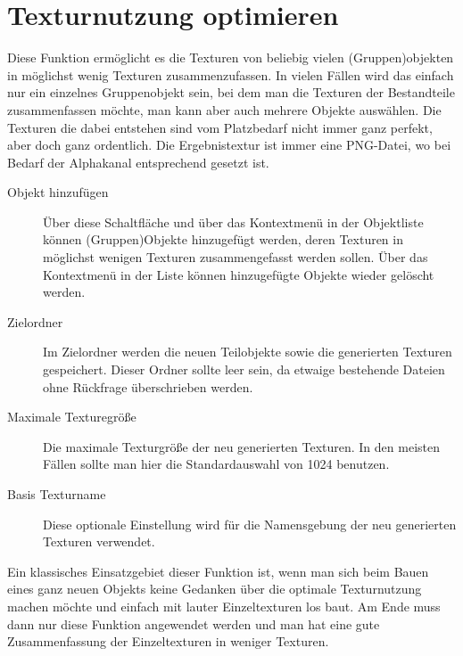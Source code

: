 
\section{Texturnutzung optimieren}
\label{sec:editor-texturnutzung-optimieren}
Diese Funktion ermöglicht es die Texturen von beliebig vielen (Gruppen)objekten in möglichst wenig Texturen zusammenzufassen. In vielen Fällen wird das einfach nur ein einzelnes Gruppenobjekt sein, bei dem man die Texturen der Bestandteile zusammenfassen möchte, man kann aber auch mehrere Objekte auswählen. Die Texturen die dabei entstehen sind vom Platzbedarf nicht immer ganz perfekt, aber doch ganz ordentlich. Die Ergebnistextur ist immer eine PNG-Datei, wo bei Bedarf der Alphakanal entsprechend gesetzt ist.

\begin{description}
\item[Objekt hinzufügen] Über diese Schaltfläche und über das Kontextmenü in der Objektliste können (Gruppen)Objekte hinzugefügt werden, deren Texturen in möglichst wenigen Texturen zusammengefasst werden sollen. Über das Kontextmenü in der Liste können hinzugefügte Objekte wieder gelöscht werden.
\item[Zielordner] Im Zielordner werden die neuen Teilobjekte sowie die generierten Texturen gespeichert. Dieser Ordner sollte leer sein, da etwaige bestehende Dateien ohne Rückfrage überschrieben werden.
\item[Maximale Texturegröße] Die maximale Texturgröße der neu generierten Texturen. In den meisten Fällen sollte man hier die Standardauswahl von 1024 benutzen.
\item[Basis Texturname] Diese optionale Einstellung wird für die Namensgebung der neu generierten Texturen verwendet. 
\end{description}

Ein klassisches Einsatzgebiet dieser Funktion ist, wenn man sich beim Bauen eines ganz neuen Objekts keine Gedanken über die optimale Texturnutzung machen möchte und einfach mit lauter Einzeltexturen los baut. Am Ende muss dann nur diese Funktion angewendet werden und man hat eine gute Zusammenfassung der Einzeltexturen in weniger Texturen.

